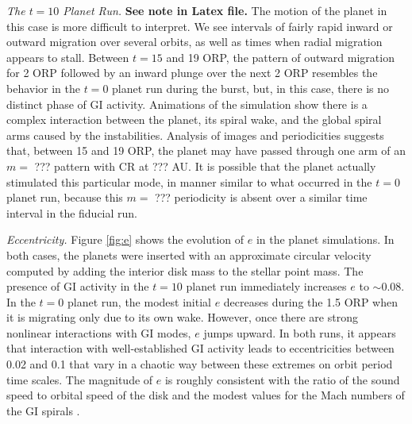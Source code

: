 \documentclass[12pt,manuscript,authoryear]{aastex}
\begin{document}
{\it The $t = 10$ Planet Run.} {\bf See note in Latex file.} The motion of the planet in this case is more difficult to interpret. We see intervals of fairly rapid inward or outward migration over several orbits, as well as times when radial migration appears to stall. Between $t = 15$ and 19 ORP, the pattern of outward migration for 2 ORP followed by an inward plunge over the next 2 ORP resembles the behavior in the $t = 0$ planet run during the burst, but, in this case, there is no distinct phase of GI activity. Animations of the simulation show there is a complex interaction between the planet, its spiral wake, and the global spiral arms caused by the instabilities. Analysis of images and periodicities suggests that, between 15 and 19 ORP, the planet may have passed through one arm of an $m =$ ??? pattern with CR at ??? AU. It is possible that the planet actually stimulated this particular mode, in manner similar to what occurred in the $t = 0$ planet run, because this $m =$ ??? periodicity is absent over a similar time interval in the fiducial run.

{\it Eccentricity.} Figure \ref{fig:e} shows the evolution of $e$ in the planet simulations. In both cases, the planets were inserted with an approximate circular velocity computed by adding the interior disk mass to the stellar point mass. The presence of GI activity in the $t = 10$ planet run immediately increases $e$ to $\sim 0.08$. In the $t = 0$ planet run, the modest initial $e$ decreases during the 1.5 ORP when it is migrating only due to its own wake. However, once there are strong nonlinear interactions with GI modes, $e$ jumps upward. In both runs, it appears that interaction with well-established GI activity leads to eccentricities between 0.02 and 0.1 that vary in a chaotic way between these extremes on orbit period time scales. The magnitude of $e$ is roughly consistent with the ratio of the sound speed to orbital speed of the disk and the modest values for the Mach numbers of the GI spirals \citep{boley2006a,boley2008}.
\end{document}
